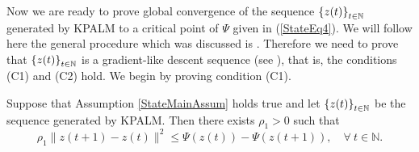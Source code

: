 Now we are ready to prove global convergence of the sequence $\left\lbrace z(t)\right\rbrace_{t \in \mathbb{N}}$ generated by KPALM to a critical point of $\Psi$ given in (\ref{StateEq4}). We will follow here the general procedure which was discussed is . Therefore we need to prove that $\left\lbrace z(t)\right\rbrace_{t \in \mathbb{N}}$ is a gradient-like descent sequence (see ), that is, the conditions (C1) and (C2) hold. We begin by proving condition (C1).

\begin{proposition} \label{State_KPALM_SDP}
Suppose that Assumption \ref{StateMainAssum} holds true and let $\left\lbrace z(t) \right\rbrace_{t \in \mathbb{N}}$ be the sequence generated by KPALM. Then there exists $\rho_1 > 0$ such that 
\begin{equation*}
	\rho_1 \|z(t+1) - z(t)\|^2 \leq \Psi(z(t)) - \Psi(z(t+1)), \quad \forall \: t \in \mathbb{N} .
\end{equation*}
\end{proposition}

